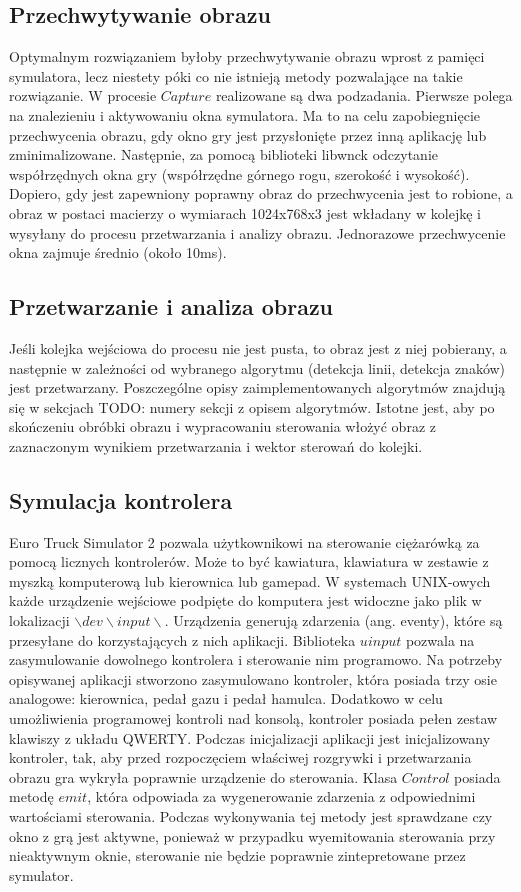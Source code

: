 \subsection{Przechwytywanie obrazu}
\label{sec:mechanism}
Optymalnym rozwiązaniem byłoby przechwytywanie obrazu wprost z pamięci symulatora, lecz niestety póki co nie istnieją metody pozwalające na takie rozwiązanie. W procesie $Capture$ realizowane są dwa podzadania. Pierwsze polega na znalezieniu i aktywowaniu okna symulatora. Ma to na celu zapobiegnięcie przechwycenia obrazu, gdy okno gry jest przysłonięte przez inną aplikację lub zminimalizowane. Następnie, za pomocą biblioteki libwnck odczytanie współrzędnych okna gry (współrzędne górnego rogu, szerokość i wysokość). Dopiero, gdy jest zapewniony poprawny obraz do przechwycenia jest to robione, a obraz w postaci macierzy o wymiarach 1024x768x3 jest wkładany w kolejkę i wysyłany do procesu przetwarzania i analizy obrazu. Jednorazowe przechwycenie okna zajmuje średnio (około 10ms).

\subsection{Przetwarzanie i analiza obrazu}
Jeśli kolejka wejściowa do procesu nie jest pusta, to obraz jest z niej pobierany, a następnie w zależności od wybranego algorytmu (detekcja linii, detekcja znaków) jest przetwarzany. Poszczególne opisy zaimplementowanych algorytmów znajdują się w sekcjach TODO: numery sekcji z opisem algorytmów. Istotne jest, aby po skończeniu obróbki obrazu i wypracowaniu sterowania włożyć obraz z zaznaczonym wynikiem przetwarzania i wektor sterowań do kolejki.

\subsection{Symulacja kontrolera}
Euro Truck Simulator 2 pozwala użytkownikowi na sterowanie ciężarówką za pomocą licznych kontrolerów. Może to być kawiatura, klawiatura w zestawie z myszką komputerową lub kierownica lub gamepad. W systemach UNIX-owych każde urządzenie wejściowe podpięte do komputera jest widoczne jako plik w lokalizacji $\backslash dev\backslash input\backslash $. Urządzenia generują zdarzenia (ang. eventy), które są przesyłane do korzystających z nich aplikacji. Biblioteka $uinput$ pozwala na zasymulowanie dowolnego kontrolera i sterowanie nim programowo. Na potrzeby opisywanej aplikacji stworzono zasymulowano kontroler, która posiada trzy osie analogowe: kierownica, pedał gazu i pedał hamulca. Dodatkowo w celu umożliwienia programowej kontroli nad konsolą, kontroler posiada pełen zestaw klawiszy z układu QWERTY. Podczas inicjalizacji aplikacji jest inicjalizowany kontroler, tak, aby przed rozpoczęciem właściwej rozgrywki i przetwarzania obrazu gra wykryła poprawnie urządzenie do sterowania. Klasa $Control$ posiada metodę $emit$, która odpowiada za wygenerowanie zdarzenia z odpowiednimi wartościami sterowania. Podczas wykonywania tej metody jest sprawdzane czy okno z grą jest aktywne, ponieważ w przypadku wyemitowania sterowania przy nieaktywnym oknie, sterowanie nie będzie poprawnie zintepretowane przez symulator.

